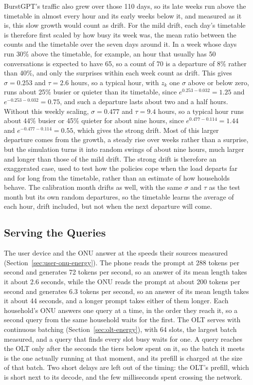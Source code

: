 \documentclass[cic,dipl,english]{infufrgs}
\begin{document}
BurstGPT's traffic also grew over those 110 days, so its late weeks run above the timetable
in almost every hour and its early weeks below it, and measured as it is, this slow growth
would count as drift. For the mild drift, each day's timetable is therefore first scaled by
how busy its week was, the mean ratio between the counts and the timetable over the seven
days around it. In a week whose days run 30\% above the timetable, for example, an hour that
usually has 50 conversations is expected to have 65, so a count of 70 is a departure of 8\%
rather than 40\%, and only the surprises within each week count as drift. This gives
$\sigma = 0.253$ and $\tau = 2.6$ hours, so a typical hour, with $z_k$
one $\sigma$ above or below zero, runs about 25\% busier or quieter than its timetable, since
$e^{0.253 - 0.032} = 1.25$ and $e^{-0.253 - 0.032} = 0.75$, and such a departure lasts about
two and a half hours. Without this weekly scaling, $\sigma = 0.477$ and $\tau = 9.4$ hours, so a
typical hour runs about 44\% busier or 45\% quieter for about nine hours, since
$e^{0.477 - 0.114} = 1.44$ and $e^{-0.477 - 0.114} = 0.55$, which gives the strong drift. Most of this larger departure comes from the growth, a steady
rise over weeks rather than a surprise, but the simulation turns it into random swings of about
nine hours, much larger and longer than those of the mild drift. The strong drift is therefore
an exaggerated case, used to test how the policies cope when the load departs far and for long
from the timetable, rather than an estimate of how households behave. The calibration month
drifts as well, with the same $\sigma$ and $\tau$ as the test month but its own random
departures, so the timetable learns the average of each hour, drift included, but not when the
next departure will come.

\subsection{Serving the Queries}
\label{sec:serving}

The user device and the ONU answer at the speeds their sources measured
(Section~\ref{sec:user-onu-energy}). The phone reads the prompt at 288 tokens per second and
generates 72 tokens per second, so an answer of its mean length takes it about 2.6 seconds,
while the ONU reads the prompt at about 200 tokens per second and generates 6.3 tokens per
second, so an answer of its mean length takes it about 44 seconds, and a longer prompt takes
either of them longer. Each household's
ONU answers one query at a time, in the order they reach it,
so a second query from the same household waits for the first. The OLT serves with continuous
batching (Section~\ref{sec:olt-energy}), with 64 slots, the largest batch measured, and a
query that finds every slot busy waits for one. A query reaches the OLT only after the
seconds the tiers below spent on it, so the batch it meets is the one actually running
at that moment, and its prefill is charged at the size of that batch. Two short delays are
left out of the timing: the OLT's prefill, which is short next to its decode, and the few
milliseconds spent crossing the network.
\end{document}
